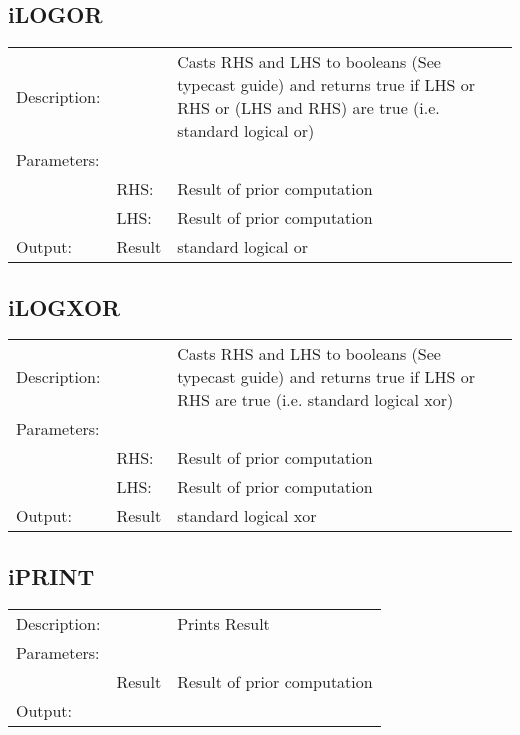 \documentclass{report}
\begin{document}
\subsection{iLOGOR}
\begin{tabular}{l l p{10cm}}
Description: & ~    & Casts RHS and LHS to booleans (See typecast guide) and returns true if LHS or RHS or (LHS and RHS) are true (i.e. standard logical or)\\
Parameters:  & ~ & ~ \\
~			 & RHS: & Result of prior computation\\
~			 & LHS: & Result of prior computation\\
Output:      & Result & standard logical or\\
\end{tabular}

\subsection{iLOGXOR}
\begin{tabular}{l l p{10cm}}
Description: & ~    & Casts RHS and LHS to booleans (See typecast guide) and returns true if LHS or RHS are true (i.e. standard logical xor)\\
Parameters:  & ~ & ~ \\
~			 & RHS: & Result of prior computation\\
~			 & LHS: & Result of prior computation\\
Output:      & Result & standard logical xor\\
\end{tabular}

\subsection{iPRINT}
\begin{tabular}{l l p{10cm}}
Description: & ~    & Prints Result\\
Parameters:  & ~ & ~ \\
~			 & Result & Result of prior computation\\
Output:      & ~ & ~\\
\end{tabular}
\end{document}
